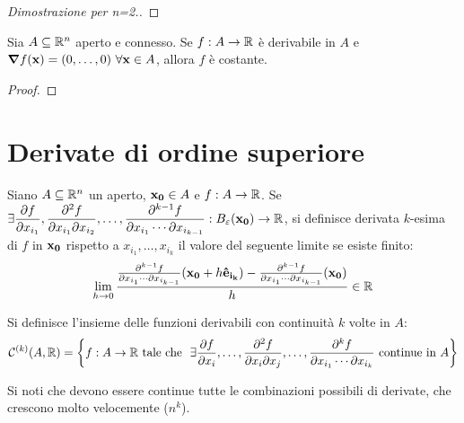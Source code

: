 \begin{proof}[Dimostrazione per n=2.]
\end{proof}

\begin{theorem}
    Sia $A \subseteq \mathbb{R}^n$ aperto e connesso. Se $f: A \to \mathbb{R}$ è derivabile in $A$ e $\grad f (\vb{x})=(0,\dots,0) \ \forall \vb{x} \in A$, allora $f$ è costante.
\end{theorem}

\begin{proof}
\end{proof}

\section{Derivate di ordine superiore}

\begin{definition}
    Siano $A \subseteq \mathbb{R}^n$ un aperto, $\vb{x_0} \in A$ e $f:A \to \mathbb{R}$. Se $\displaystyle \exists \frac{\partial f}{\partial x_{i_1}}, \frac{\partial^2 f}{\partial x_{i_1} \partial x_{i_2}},\dots,\frac{\partial ^{k-1}f}{\partial x_{i_1} \cdots \partial x_{i_{k-1}}} : B_\varepsilon(\vb{x_0}) \to \mathbb{R}$, si definisce derivata $k$-esima di $f$ in $\vb{x_0}$ rispetto a $x_{i_1},\dots,x_{i_{k}}$ il valore del seguente limite se esiste finito:
    $$
        \lim_{h\to 0}\frac{\frac{\partial^{k-1}f}{\partial x_{i_1}\cdots \partial x_{i_{k-1}}}(\vb{x_0}+ h \vb{\hat{e}_{i_k}})- \frac{\partial^{k-1}f}{\partial x_{i_1}\cdots \partial x_{i_{k-1}}}(\vb{x_0})}{h} \in \mathbb{R}
    $$
\end{definition}

\begin{definition}
    [Insieme $\C{k}(A, \R)$]
    Si definisce l'insieme delle funzioni derivabili con continuità $k$ volte in $A$:
    $$
        \displaystyle \mathcal{C}^{(k)}(A,\mathbb{R}) = \left\{ f: A \to \mathbb{R} \text{ tale che } \ \exists \frac{\partial f}{\partial x_i},\dots,\frac{\partial ^2 f}{\partial x_i \partial x_j}, \dots, \frac{\partial ^k f}{\partial x_{i_1}\cdots\partial x_{i_k}} \text{ continue in } A \right\}
    $$
\end{definition}

\begin{remark}
    Si noti che devono essere continue tutte le combinazioni possibili di derivate, che crescono molto velocemente ($n^k$).
\end{remark}

